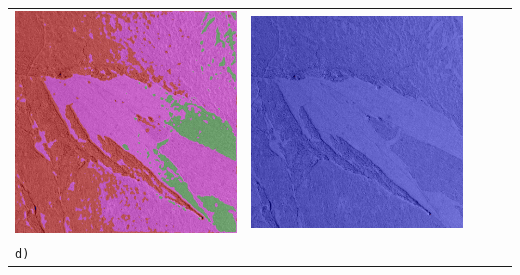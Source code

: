 \begin{table}[h!]
\begin{tabularx}{\textwidth}{>{\centering}m{}
			>{\centering}m{}
			>{\centering}m{}
			>{\centering}m{}
			>{\centering\arraybackslash}m{}}
		\includegraphics[width=0.9\linewidth]{images/gen/fully_connected/p03_03.png_1.png} &
		\includegraphics[width=0.9\linewidth]{images/gen/fully_connected/p03_03.png_2.png} \\
		\texttt{d)} &

\end{tabularx}
\end{table}
